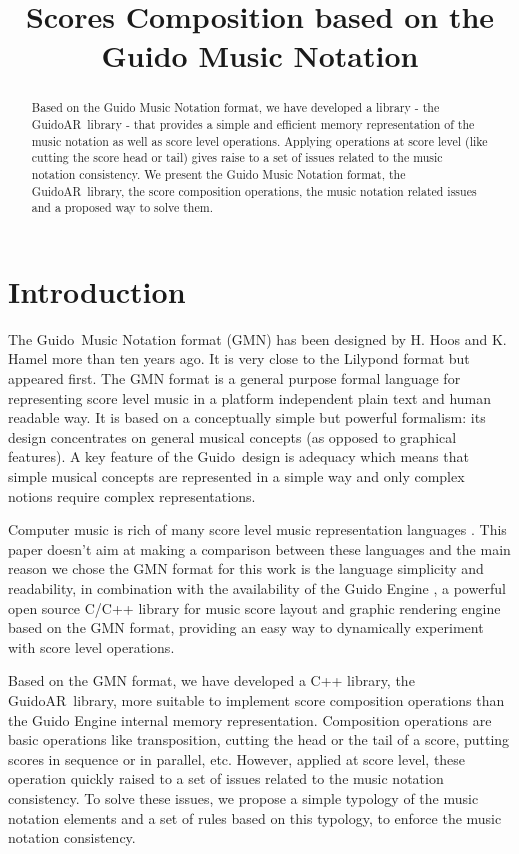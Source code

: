 \documentclass{article}
\title{Scores Composition based on the Guido Music Notation}
\newcommand{\Guido}	{Guido}
\newcommand{\GAR}		{GuidoAR}
\begin{document}
%
\maketitle
%
\begin{abstract}
Based on the Guido Music Notation format, we have developed a library - the \GAR\ library - that provides a simple and efficient memory representation of the music notation as well as score level operations. Applying operations at score level (like cutting the score head or tail) gives raise to a set of issues related to the music notation consistency. We present the Guido Music Notation format, the \GAR\ library, the score composition operations, the music notation related issues and a proposed way to solve them.
\end{abstract}

\section{Introduction}\label{sec:intro}
The \Guido\ Music Notation format (GMN) \cite{hoos98} \cite{guido} has been designed by H. Hoos and K. Hamel more than ten years ago. It is very close to the Lilypond format\cite{lilypond03} \cite{lilypond06} but appeared first. The GMN format is a general purpose formal language for representing score level music in a platform independent plain text and human readable way. It is based on a conceptually simple but powerful formalism: its design concentrates on general musical concepts (as opposed to graphical features). A key feature of the \Guido\ design is adequacy which means that simple musical concepts are represented in a simple way and only complex notions require complex representations.

Computer music is rich of many score level music representation languages \cite{Hewlett97}\cite{Huron97}\cite{darms}\cite{SCORE}\cite{good01}. This paper doesn't aim at making a comparison between these languages and the main reason we chose the GMN format for this work is the language simplicity and readability, in combination with the availability of the Guido Engine \cite{Fober:04b}\cite{daudin09a}, a powerful open source C/C++ library for music score layout and graphic rendering engine based on the GMN format, providing an easy way to dynamically experiment with score level operations. 

Based on the GMN format, we have developed a C++ library, the \GAR\ library, more suitable to implement score composition operations than the Guido Engine internal memory representation. Composition operations are basic operations like transposition, cutting the head or the tail of a score, putting scores in sequence or in parallel, etc. However, applied at score level, these operation quickly raised to a set of issues related to the music notation consistency. To solve these issues, we propose a simple typology of the music notation elements and a set of rules based on this typology, to enforce the music notation consistency.
\end{document}
